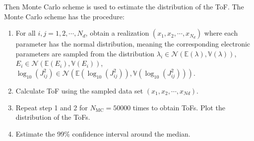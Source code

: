 \documentclass[letterpaper,12pt]{article}
\begin{document}
Then Monte Carlo scheme is used to estimate the distribution of the ToF. The Monte Carlo scheme has the procedure:
\begin{enumerate}
\item For all $i,j=1,2,\cdots, N_d$, obtain a realization $(x_1, x_2, \cdots, x_{N_d})$ where each parameter has the normal distribution, meaning the corresponding electronic parameters are sampled from the distribution $\lambda_i \in \mathcal{N}(\mathbb{E}(\lambda), \mathbb{V}(\lambda))$, $E_i \in \mathcal{N}(\mathbb{E}(E_i), \mathbb{V}(E_i))$, $\log_{10}(J_{ij}^2) \in \mathcal{N}(\mathbb{E}(\log_{10}(J_{ij}^2)), \mathbb{V}(\log_{10}(J_{ij}^2)))$. 
\item Calculate ToF using the sampled data set $(x_1, x_2, \cdots, x_{Nd})$. 
\item Repeat step 1 and 2 for $N_\text{MC} = 50000$ times to obtain ToFs. Plot the distribution of the ToFs.
\item Estimate the 99\% confidence interval around the median.
\end{enumerate}

\end{document}
